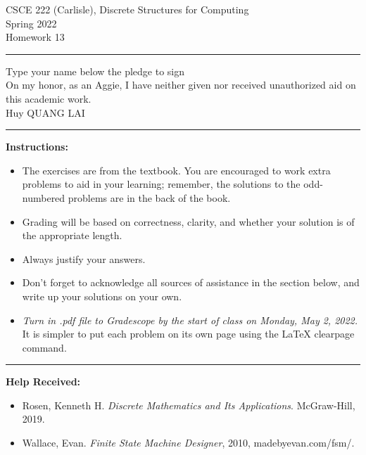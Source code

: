 \documentclass[12pt]{article}  %
\begin{document}
\begin{center}         %
{\large                %
CSCE 222 (Carlisle), Discrete Structures for Computing \\  %
Spring 2022 \\
Homework 13}
\end{center}
\rule{6in}{.1pt}       %
\begin{center}
{\large
Type your name below the pledge to sign\\
On my honor, as an Aggie, I have neither given nor received unauthorized aid on this academic work.\\
Huy QUANG LAI}
\end{center}


\rule{6in}{.1pt}       %
                    
\noindent              %
{\bf Instructions:}    %

\begin{itemize}        %
\item The exercises are from the textbook.  You are encouraged to work
      extra problems to aid in your learning; remember, the solutions to 
      the odd-numbered problems are in the back of the book.
\item Grading will be based on correctness, clarity, and whether your
      solution is of the appropriate length.
\item Always justify your answers.
\item Don't forget to acknowledge all sources of assistance in the section below, and write up your solutions on your own.
\item {\em Turn in .pdf file to Gradescope by the start of class on Monday, May 2, 2022.}  It is simpler to put each problem on its own page using the LaTeX clearpage command.
\end{itemize}


\rule{6in}{.1pt}       %

{\bf Help Received:}    %
\begin{itemize}
\item Rosen, Kenneth H. \textit{Discrete Mathematics and Its Applications}. McGraw-Hill, 2019.
\item Wallace, Evan. \textit{Finite State Machine Designer}, 2010, madebyevan.com/fsm/. 
\end{itemize}
\end{document}
